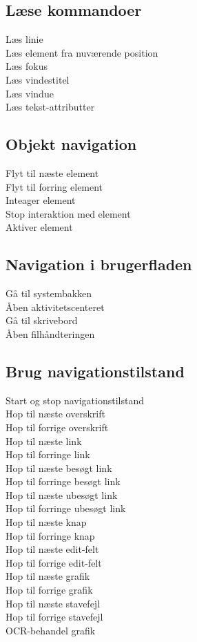 \documentclass[a4paper, landscape, 11pt]{scrartcl}
\newcommand{\command}[2]{#1~\dotfill{}~#2\\} %
\begin{document}
\begin{multicols}{2}
\subsection*{Læse kommandoer}
\command{Læs linie}{}
\command{Læs element fra nuværende position}{\keys{NVDA + \arrowkeydown}}
\command{Læs fokus}{}
\command{Læs vindestitel}{}
\command{Læs vindue}{}
\command{Læs tekst-attributter}{}

\subsection*{Objekt navigation}
\command{Flyt til næste element}{}
\command{Flyt til forring element}{}
\command{Inteager element}{}
\command{Stop interaktion med element}{\keys{NVDA  + \arrowkeyup}}
\command{Aktiver element}{}

\subsection*{Navigation i brugerfladen}
\command{Gå til systembakken}{}
\command{Åben aktivitetscenteret}{}
\command{Gå til skrivebord}{}
\command{Åben filhåndteringen}{}

\subsection*{Brug navigationstilstand}
\command{Start og stop navigationstilstand}{}
\command{Hop til næste overskrift}{}
\command{Hop til forrige overskrift}{}
\command{Hop til næste link}{}
\command{Hop til forringe link}{}
\command{Hop til næste besøgt link}{}
\command{Hop til forringe besøgt link}{}
\command{Hop til næste ubesøgt link}{}
\command{Hop til forringe ubesøgt link}{}
\command{Hop til næste knap}{}
\command{Hop til forringe knap}{}
\command{Hop til næste edit-felt}{}
\command{Hop til forrige edit-felt}{}
\command{Hop til næste grafik}{}
\command{Hop til forrige grafik}{}
\command{Hop til næste stavefejl}{}
\command{Hop til forrige stavefejl}{}
\command{OCR-behandel grafik}{}


\end{multicols}
\end{document}
